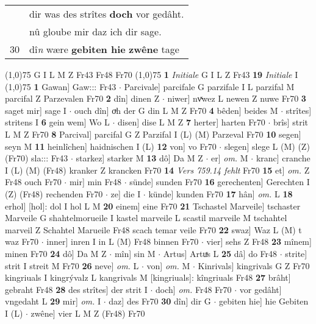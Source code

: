 \documentclass[8pt,a4paper,notitlepage]{article}
\begin{document}
\begin{table}[ht]
\begin{minipage}[t]{0.5\linewidth}
\begin{tabular}{rl}
 & dir was des strîtes \textbf{doch} vor gedâht.\\ 
 & nû gloube mir daz ich dir sage.\\ 
30 & dî\textit{n} wære \textbf{gebiten hie} \textbf{zwêne} tage\\ 
\end{tabular}
\scriptsize
\line(1,0){75} \newline
G I L M Z Fr43 Fr48 Fr70 \newline
\line(1,0){75} \newline
\textbf{1} \textit{Initiale} G I L Z Fr43  \textbf{19} \textit{Initiale} I  \newline
\line(1,0){75} \newline
\textbf{1} Gawan] Gaw::: Fr43  $\cdot$ Parcivale] parcifale G parzifale I L parzifal M parcifal Z Parzevalen Fr70 \textbf{2} dîn] dinen Z  $\cdot$ niwer] nvͯwez L newen Z nuwe Fr70 \textbf{3} saget mir] sage I  $\cdot$ ouch dîn] oͮh der G din L M Z Fr70 \textbf{4} bêden] beides M  $\cdot$ strîtes] stritens I \textbf{6} gein wem] Wo L  $\cdot$ disen] dise L M Z \textbf{7} herter] harten Fr70  $\cdot$ brîs] strit L M Z Fr70 \textbf{8} Parcival] parcifal G Z Parzifal I (L) (M) Parzeval Fr70 \textbf{10} segen] seyn M \textbf{11} heinlîchen] haidnischen I (L) \textbf{12} von] vo Fr70  $\cdot$ slegen] slege L (M) (Z) (Fr70) sla::: Fr43  $\cdot$ starkez] starker M \textbf{13} dô] Da M Z  $\cdot$ er] \textit{om.} M  $\cdot$ kranc] cranche I (L) (M) (Fr48) kranker Z krancken Fr70 \textbf{14} \textit{Vers 759.14 fehlt} Fr70  \textbf{15} et] \textit{om.} Z Fr48 ouch Fr70  $\cdot$ mir] min Fr48  $\cdot$ sünde] sunden Fr70 \textbf{16} gerechenten] Gerechten I (Z) (Fr48) rechenden Fr70  $\cdot$ ze] die I  $\cdot$ künde] kunden Fr70 \textbf{17} hân] \textit{om.} L \textbf{18} erhol] [hol]: dol I hol L M \textbf{20} einem] eine Fr70 \textbf{21} Tschastel Marveile] tschaster Marveile G shahtelmorueile I kastel marveile L scastil marveile M tschahtel marveil Z Schahtel Marueile Fr48 scach temar veile Fr70 \textbf{22} swaz] Waz L (M) t waz Fr70  $\cdot$ inner] inren I in L (M) Fr48 binnen Fr70  $\cdot$ vier] sehs Z Fr48 \textbf{23} mînem] minen Fr70 \textbf{24} dô] Da M Z  $\cdot$ mîn] sin M  $\cdot$ Artus] Artuͯs L \textbf{25} dâ] do Fr48  $\cdot$ strite] strit I streit M Fr70 \textbf{26} neve] \textit{om.} L  $\cdot$ von] \textit{om.} M  $\cdot$ Kinrivals] kingrivals G Z Fr70 kingriuals I kingrývalz L kangrivals M [kingriuals]: kîngriuals Fr48 \textbf{27} brâht] gebraht Fr48 \textbf{28} des strîtes] der strit I  $\cdot$ doch] \textit{om.} Fr48 Fr70  $\cdot$ vor gedâht] vngedaht L \textbf{29} mir] \textit{om.} I  $\cdot$ daz] des Fr70 \textbf{30} dîn] dir G  $\cdot$ gebiten hie] hie Gebiten I (L)  $\cdot$ zwêne] vier L M Z (Fr48) Fr70 \newline

\end{minipage}
\end{table}
\end{document}
